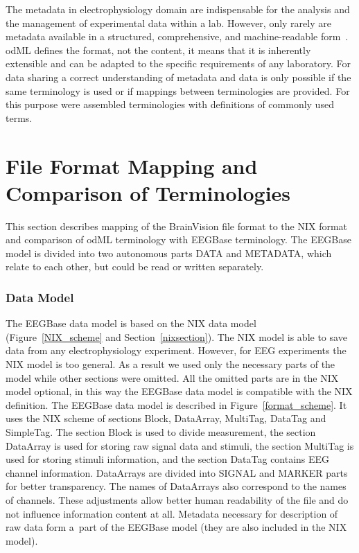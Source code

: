 \documentclass[conference]{IEEEtran}
\begin{document}
The metadata in electrophysiology domain are indispensable for the analysis and the management of experimental data within a lab. However, only rarely are metadata available in a structured, comprehensive, and machine-readable form~\cite{odml}. odML defines the format, not the content, it means that it is inherently extensible and can be adapted to the specific requirements of any laboratory. For data sharing a correct understanding of metadata and data is only possible if the same terminology is used or if mappings between terminologies are provided. For this purpose were assembled terminologies with definitions of commonly used terms.~\cite{odmlarticle}


\section{File Format Mapping and Comparison of Terminologies}

This section describes mapping of the BrainVision file format to the NIX format and comparison of odML terminology with EEGBase terminology. The EEGBase model is divided into two autonomous parts DATA and METADATA, which relate to each other, but could be read or written separately.
 
\subsubsection{Data Model}
\label{section_data}
The EEGBase data model is based on the NIX data model (Figure~\ref{NIX_scheme} and Section~\ref{nixsection}). The NIX model is able to save data from any electrophysiology experiment. However, for EEG experiments the NIX model is too general. As a result we used only the necessary parts of the model while other sections were omitted. All the omitted parts are in the NIX model optional, in this way the EEGBase data model is compatible with the NIX definition. The EEGBase data model is described in Figure~\ref{format_scheme}. It uses the NIX scheme of sections Block, DataArray, MultiTag, DataTag and SimpleTag. The section Block is used to divide measurement, the section DataArray is used for storing raw signal data and stimuli, the section MultiTag is used for storing stimuli information, and the section DataTag contains EEG channel information. DataArrays are divided into SIGNAL and MARKER parts for better transparency. The names of DataArrays also correspond to the names of channels. These adjustments allow better human readability of the file and do not influence information content at all. Metadata necessary for description of raw data form a~part of the EEGBase model (they are also included in the NIX model).   
\end{document}
